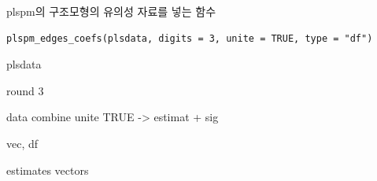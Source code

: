 \documentclass[a4paper]{book}
\begin{document}
%
\begin{Description}
plspm의 구조모형의 유의성 자료를 넣는 함수
\end{Description}
%
\begin{Usage}
\begin{verbatim}
plspm_edges_coefs(plsdata, digits = 3, unite = TRUE, type = "df")
\end{verbatim}
\end{Usage}
%
\begin{Arguments}
\begin{ldescription}
\item[\code{plsdata}] plsdata

\item[\code{digits}] round 3

\item[\code{unite}] data combine unite TRUE -> estimat + sig

\item[\code{type}] vec, df
\end{ldescription}
\end{Arguments}
%
\begin{Value}
estimates vectors
\end{Value}
%
\end{document}
